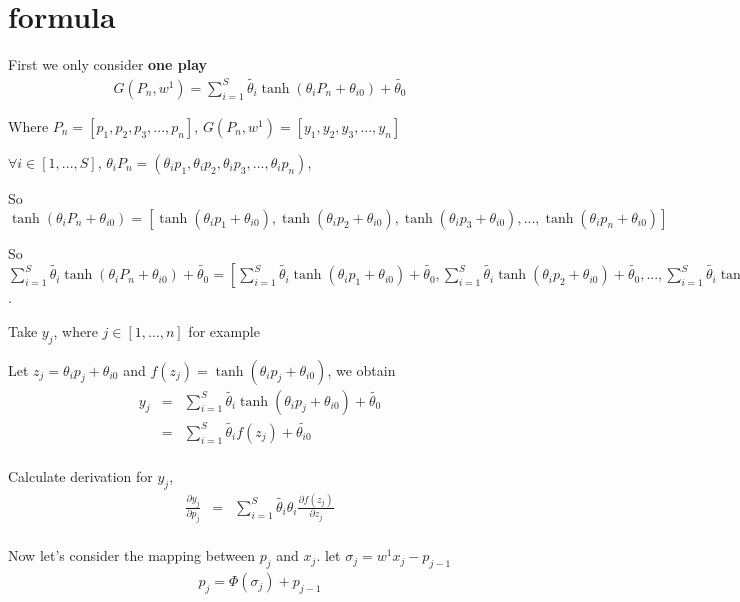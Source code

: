 \documentclass[11pt]{article}
\date{\today}
\title{}
\begin{document}
\tableofcontents

\section{formula}
\label{sec:orgf02c92a}
First we only consider \textbf{one play}
\begin{eqnarray}
G(P_{n}, w^{1}) = \sum_{i=1}^{S} \tilde{\theta_{i}} \tanh(\theta_{i} P_{n} + \theta_{i0}) + \tilde{\theta_{0}}
\end{eqnarray}

Where \(P_{n} = [p_{1}, p_{2}, p_{3}, ..., p_{n}]\), \(G(P_{n}, w^{1}) = [y_{1}, y_{2}, y_{3}, ..., y_{n}]\)

\(\forall{i} \in [1, ..., S]\), \(\theta_{i} P_{n} = (\theta_{i} p_{1}, \theta_{i} p_{2}, \theta_{i} p_{3}, ..., \theta_{i} p_{n})\),

So
\(\tanh(\theta_{i} P_{n} + \theta_{i0}) =
[\tanh(\theta_{i} p_{1} + \theta_{i0}),
\tanh(\theta_{i} p_{2} + \theta_{i0}),
\tanh(\theta_{i} p_{3} + \theta_{i0}),
...,
\tanh(\theta_{i} p_{n} + \theta_{i0})]\)

So \(\sum_{i=1}^{S} \tilde{\theta_{i}} \tanh(\theta_{i} P_{n} + \theta_{i0}) + \tilde{\theta_{0}} =
[\sum_{i=1}^{S} \tilde{\theta_{i}} \tanh(\theta_{i} p_{1} + \theta_{i0}) + \tilde{\theta_{0}},
\sum_{i=1}^{S} \tilde{\theta_{i}} \tanh(\theta_{i} p_{2} + \theta_{i0}) + \tilde{\theta_{0}},
...,
\sum_{i=1}^{S} \tilde{\theta_{i}} \tanh(\theta_{i} p_{n} + \theta_{i0}) + \tilde{\theta_{0}}] =
[y_{1}, y_{2}, ..., y_{n}]\).

Take \(y_{j}\), where \(j \in [1, ..., n]\) for example

Let \(z_j=\theta_i p_j + \theta_{i0}\) and \(f(z_j) = \tanh(\theta_i p_j + \theta_{i0})\), we obtain
\begin{eqnarray}
y_{j}  &=& \sum_{i=1}^{S} \tilde{\theta_{i}} \tanh(\theta_{i} p_{j} + \theta_{i0}) + \tilde{\theta_{0}}  \\
       &=& \sum_{i=1}^{S} \tilde{\theta_{i}} f(z_j) + \tilde{\theta_{i0}} \\
\end{eqnarray}

Calculate derivation for \(y_{j}\),
\begin{eqnarray}
\frac{\partial y_{j}}{\partial p_{j}} &=& \sum_{i=1}^{S} \tilde{\theta_{i}} \theta_{i} \frac{\partial f(z_j)}{\partial z_{j}}  \\
\end{eqnarray}

Now let's consider the mapping between \(p_{j}\) and \(x_{j}\). let \(\sigma_{j} = w^{1} x_{j} - p_{j-1}\)
\begin{eqnarray}
p_{j} = \Phi(\sigma_{j}) + p_{j-1}
\end{eqnarray}
\end{document}
